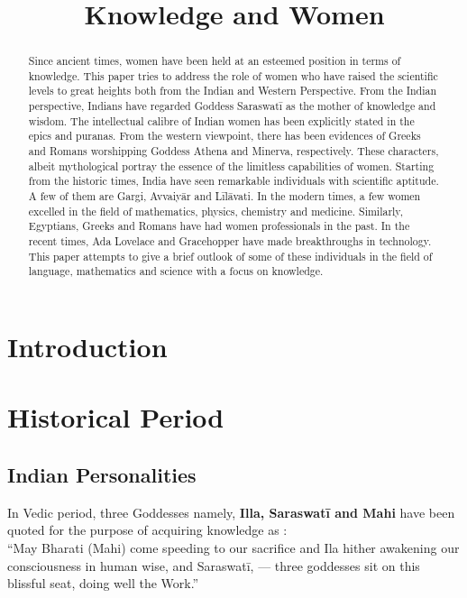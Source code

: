 \documentclass[a4paper,10pt]{article}
\title{Knowledge and Women}
\author{}
\begin{document}
\maketitle

\begin{abstract}
Since ancient times, women have been held at an esteemed position in terms of knowledge. This paper tries to address the role of women who have raised the scientific levels to great heights both from the Indian and Western Perspective. From the Indian perspective, Indians have regarded Goddess Saraswat\={i} as the mother of knowledge and wisdom. The intellectual calibre of Indian women has been explicitly stated in the epics and puranas. From the western viewpoint,  there has been evidences of Greeks and Romans worshipping Goddess Athena and Minerva, respectively. These characters, albeit mythological portray the essence of the limitless capabilities of women. Starting from the historic times, India have seen remarkable individuals with scientific aptitude. A few of them are Gargi, Avvaiy\={a}r and L\={i}l\={a}vati. In the modern times, a few women excelled in the field of mathematics, physics, chemistry and medicine. Similarly, Egyptians, Greeks and Romans have had women professionals in the past. In the recent times, Ada Lovelace and Gracehopper have made breakthroughs in technology. This paper attempts to give a brief outlook of some of these individuals in the field of language, mathematics and science with a focus on knowledge. 
\end{abstract}
\section{Introduction}

\section{Historical Period}

\subsection{Indian Personalities}
In Vedic period, three Goddesses namely, \textbf{Illa, Saraswat\={i} and Mahi} have been quoted for the purpose of acquiring knowledge as \cite{saras}: \\
“May Bharati (Mahi) come speeding to our sacrifice and Ila hither awakening our consciousness in human wise, and Saraswat\={i}, — three goddesses sit on this blissful seat, doing well the Work.” \\
\end{document}
